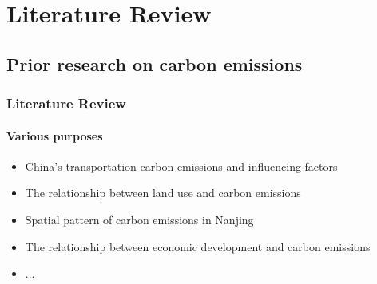 \documentclass[light]{lutbeamer} %
\begin{document}
\section{Literature Review}
\subsection{Prior research on carbon emissions}
\begin{frame}
    \frametitle{Literature Review}
    \framesubtitle{Various purposes}
    \begin{itemize}
        \item China’s transportation carbon emissions and influencing factors \cite{cai2022-spatialtemporal}
        \item The relationship between land use and carbon emissions \cite{huang2022-study}
        \item Spatial pattern of carbon emissions in Nanjing \cite{wu2022-prediction}
        \item The relationship between economic development and carbon emissions \cite{yin2022-spatial}
        \item ...
    \end{itemize}
\end{frame}
\end{document}
